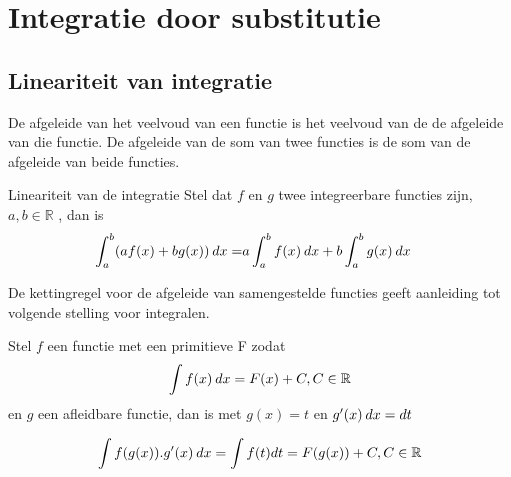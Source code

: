 \chapter{Integratie door substitutie}

\section{Lineariteit van integratie}
De afgeleide van het veelvoud van een functie is het veelvoud
van de de afgeleide van die functie.
De afgeleide van de som van twee functies is de som van de afgeleide van beide functies. \\
\begin{theorem}{Lineariteit van de integratie}
	Stel dat $f$ en $g$ twee integreerbare functies zijn, $a,b \in \mathbb{R}$
	, dan is
	\begin{eqnarray}
	\int_a^b (af(x) + bg(x)) \hspace{2pt}dx = & a \int_a^b f(x)\hspace{2pt}dx + b \int_a^b g(x) \hspace{2pt}dx
	\end{eqnarray}
\end{theorem}

De kettingregel voor de afgeleide van samengestelde functies
geeft aanleiding tot volgende stelling voor integralen.

\begin{theorem}
	Stel $f$ een functie met een primitieve F zodat 
	\[ \int f(x) \hspace{2pt}dx = F(x) +C, C \in \mathbb{R}\]
	en $g$ een afleidbare functie, dan is met $g(x) =t$  en $g'(x)\hspace{2pt}dx = dt$ 
	
	\begin{eqnarray}
	\int f(g(x)).g'(x)\hspace{2pt}dx =  \int f(t) dt   = F(g(x)) + C, C \in \mathbb{R}
	\end{eqnarray}
\end{theorem}